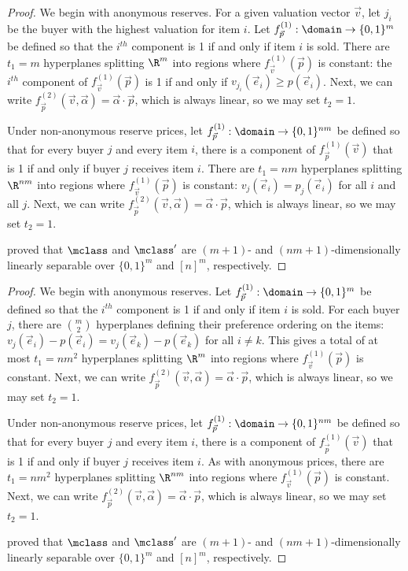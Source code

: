 \begin{proof}
We begin with anonymous reserves. For a given valuation vector $\vec{v}$, let $j_i$ be the buyer with the highest valuation for item $i$. Let $f_{\vec{p}}^{(1)}: \domain \to \{0,1\}^m$ be defined so that the $i^{th}$ component is 1 if and only if item $i$ is sold. There are $t_1 = m$ hyperplanes splitting $\R^m$ into regions where $f_{\vec{v}}^{(1)}(\vec{p})$ is constant: the $i^{th}$ component of $f_{\vec{v}}^{(1)}(\vec{p})$ is 1 if and only if $v_{j_i}(\vec{e}_i) \geq p(\vec{e}_i)$. Next, we can write $f_{\vec{p}}^{(2)}(\vec{v}, \vec{\alpha}) = \vec{\alpha} \cdot \vec{p}$, which is always linear, so we may set $t_2 = 1$.

Under non-anonymous reserve prices, let $f_{\vec{p}}^{(1)}: \domain \to \{0,1\}^{nm}$ be defined so that for every buyer $j$ and every item $i$, there is a component of $f_{\vec{p}}^{(1)}(\vec{v})$ that is 1 if and only if buyer $j$ receives item $i$. There are $t_1 = nm$ hyperplanes splitting $\R^{nm}$ into regions where $f_{\vec{v}}^{(1)}(\vec{p})$ is constant: $v_{j}(\vec{e}_i) = p_{j}(\vec{e}_i)$ for all $i$ and all $j$. Next, we can write $f_{\vec{p}}^{(2)}(\vec{v}, \vec{\alpha}) = \vec{\alpha} \cdot \vec{p}$, which is always linear, so we may set $t_2 = 1$.

\citet{Morgenstern16:Learning} proved that $\mclass$ and $\mclass'$ are $(m+1)$- and $(nm+1)$-dimensionally linearly separable over $\{0,1\}^m$ and $[n]^m$, respectively.
\end{proof}

\itemUnit*

\begin{proof}
We begin with anonymous reserves. Let $f_{\vec{p}}^{(1)}: \domain \to \{0,1\}^m$ be defined so that the $i^{th}$ component is 1 if and only if item $i$ is sold. For each buyer $j$, there are ${m \choose 2}$ hyperplanes defining their preference ordering on the items: $v_j(\vec{e}_i) - p(\vec{e}_i) = v_j(\vec{e}_k) - p(\vec{e}_k)$ for all $i \not = k$. This gives a total of at most $t_1 = nm^2$ hyperplanes splitting $\R^m$ into regions where $f_{\vec{v}}^{(1)}(\vec{p})$ is constant. Next, we can write $f_{\vec{p}}^{(2)}(\vec{v}, \vec{\alpha}) = \vec{\alpha} \cdot \vec{p}$, which is always linear, so we may set $t_2 = 1$.

Under non-anonymous reserve prices, let $f_{\vec{p}}^{(1)}: \domain \to \{0,1\}^{nm}$ be defined so that for every buyer $j$ and every item $i$, there is a component of $f_{\vec{p}}^{(1)}(\vec{v})$ that is 1 if and only if buyer $j$ receives item $i$. As with anonymous prices, there are $t_1 = nm^2$ hyperplanes splitting $\R^{nm}$ into regions where $f_{\vec{v}}^{(1)}(\vec{p})$ is constant. Next, we can write $f_{\vec{p}}^{(2)}(\vec{v}, \vec{\alpha}) = \vec{\alpha} \cdot \vec{p}$, which is always linear, so we may set $t_2 = 1$.

\citet{Morgenstern16:Learning} proved that $\mclass$ and $\mclass'$ are $(m+1)$- and $(nm+1)$-dimensionally linearly separable over $\{0,1\}^m$ and $[n]^m$, respectively.
\end{proof}

